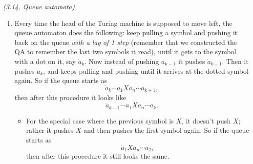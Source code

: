 \begin{problem}{\it (3.14, Queue automata)}
\begin{enumerate}
For instance, if we start with
\[
\dot a_{k} \cdots a_1Xa_n\cdots a_{k+1},
\]
then after this procedure the queue looks like 
\[
\dot a_{k+1}a_k\cdots a_1Xa_n\cdots a_{k+1},
\]
and the queue automaton remembers that it has just read $a_{k+1}$ (and acts on that information).
\begin{itemize}
\item
For the special case where the next symbol is $X$, signalling the end of the queue, the QA instead do the following. Add a dotted blank and $X$, and keep pulling and pushing until it arrives at the dotted blank again. So if the queue starts as
\[
\dot a_n\cdots a_1X
\]
then after this procedure it looks like
\[
\dot{\textvisiblespace}a_n\cdots a_1X.
\]
\end{itemize}
\item
Every time the head of the Turing machine is supposed to move left, the queue automaton does the following: keep pulling a symbol and pushing it back on the queue {\it with a lag of 1 step} (remember that we constructed the QA to remember the last two symbols it read), 
until it gets to the symbol with a dot on it, say $\dot a_k$. Now instead of pushing $a_{k-1}$ it pushes $\dot a_{k-1}$. Then it pushes $a_k$, and keeps pulling and pushing until it arrives at the dotted symbol again.
So if the queue starts as
\[
\dot a_{k} \cdots a_1Xa_n\cdots a_{k+1},
\]
then after this procedure it looks like
\[
\dot a_{k-1} \cdots a_1Xa_n\cdots a_{k}.
\]
\begin{itemize}
\item
For the special case where the previous symbol is $X$, it doesn't push $X$; rather it pushes $X$ and then pushes the first symbol again. So if the queue starts as
\[
\dot a_{1}Xa_n\cdots a_{2},
\]
then after this procedure it still looks the same.
\end{itemize}
\end{enumerate}
\end{problem}
